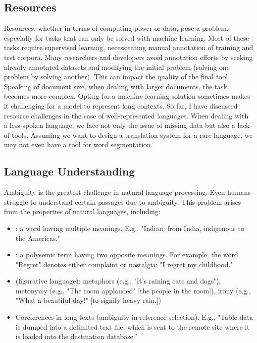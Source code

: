 \documentclass{KBook}
\begin{document}
\subsection{Resources}

Resources, whether in terms of computing power or data, pose a problem, especially for tasks that can only be solved with machine learning. Most of these tasks require supervised learning, necessitating manual annotation of training and test corpora. Many researchers and developers avoid annotation efforts by seeking already annotated datasets and modifying the initial problem (solving one problem by solving another). This can impact the quality of the final tool. Speaking of document size, when dealing with larger documents, the task becomes more complex. Opting for a machine learning solution sometimes makes it challenging for a model to represent long contexts. So far, I have discussed resource challenges in the case of well-represented languages. When dealing with a less-spoken language, we face not only the issue of missing data but also a lack of tools. Assuming we want to design a translation system for a rare language, we may not even have a tool for word segmentation.

\subsection{Language Understanding}

Ambiguity is the greatest challenge in natural language processing. Even humans struggle to understand certain passages due to ambiguity. This problem arises from the properties of natural languages, including:

\begin{itemize}
	\item {}: a word having multiple meanings. E.g., "Indian: from India, indigenous to the Americas."
	\item {}: a polysemic term having two opposite meanings. For example, the word "Regret" denotes either complaint or nostalgia: "I regret my childhood."
	\item {} (figurative language): metaphors (e.g., "It's raining cats and dogs"), metonymy (e.g., "The room applauded" [the people in the room]), irony (e.g., "What a beautiful day!" [to signify heavy rain.])
	\item Coreferences in long texts (ambiguity in reference selection). E.g., "Table data is dumped into a delimited text file, which is sent to the remote site where it is loaded into the destination database."
\end{itemize}
\end{document}
